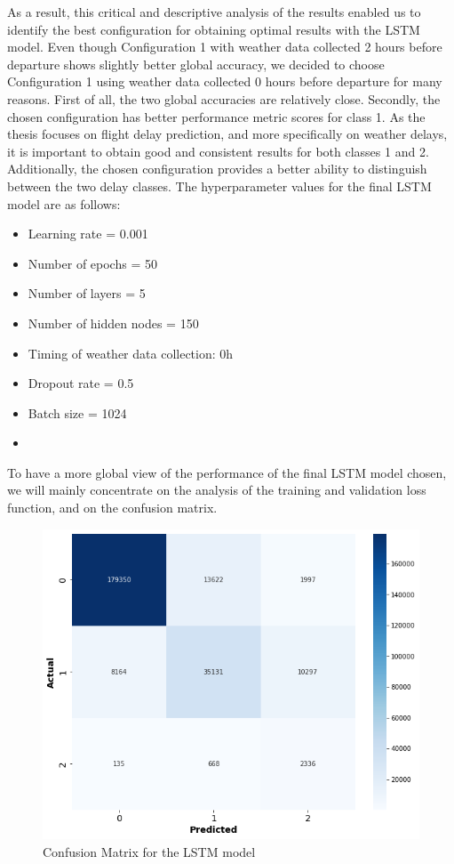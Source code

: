 \documentclass[12pt,oneside]{book} %
\begin{document}
\noindent As a result, this critical and descriptive analysis of the results enabled us to identify the best configuration for obtaining optimal results with the LSTM model. Even though Configuration 1 with weather data collected 2 hours before departure shows slightly better global accuracy, we decided to choose Configuration 1 using weather data collected 0 hours before departure for many reasons. First of all, the two global accuracies are relatively close. Secondly, the chosen configuration has better performance metric scores for class 1. As the thesis focuses on flight delay prediction, and more specifically on weather delays, it is important to obtain good and consistent results for both classes 1 and 2. Additionally, the chosen configuration provides a better ability to distinguish between the two delay classes. The hyperparameter values for the final LSTM model are as follows:
\begin{multicols}{2}
    \begin{itemize}
        \item Learning rate = 0.001
        \item Number of epochs = 50
        \item Number of layers = 5
        \item Number of hidden nodes = 150
    \end{itemize}
    \begin{itemize}
         \item Timing of weather data collection: 0h
         \item Dropout rate  = 0.5
         \item Batch size = 1024
         \item[\hspace{0pt}]
    \end{itemize}
\end{multicols}

\noindent To have a more global view of the performance of the final LSTM model chosen, we will mainly concentrate on the analysis of the training and validation loss function, and on the confusion matrix.

\begin{figure}[H]
    \centering
    \includegraphics[width=0.73\linewidth]{Image/Confusionmatrix_LSTM.png}
    \caption{\centering Confusion Matrix for the LSTM model}
    \label{fig:Confusionmatrix_LSTM}
\end{figure}
\end{document}
